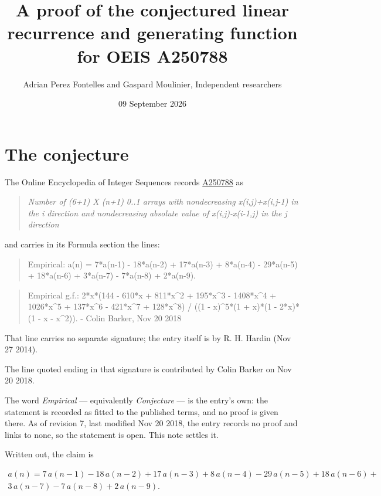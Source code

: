 \documentclass[11pt]{article}
\title{A proof of the conjectured linear recurrence and generating function for OEIS A250788}
\author{Adrian Perez Fontelles and Gaspard Moulinier, Independent researchers}
\date{09 September 2026}
\theoremstyle{definition}
\begin{document}
\maketitle
\section{The conjecture}

The Online Encyclopedia of Integer Sequences records \href{https://oeis.org/A250788}{A250788} as

\begin{quote}\itshape Number of (6+1) X (n+1) 0..1 arrays with nondecreasing x(i,j)+x(i,j-1) in the i direction and nondecreasing absolute value of x(i,j)-x(i-1,j) in the j direction\end{quote}

and carries in its Formula section the lines:

\begin{quote}\ttfamily Empirical: a(n) = 7*a(n-1) - 18*a(n-2) + 17*a(n-3) + 8*a(n-4) - 29*a(n-5) + 18*a(n-6) + 3*a(n-7) - 7*a(n-8) + 2*a(n-9).\end{quote}

\begin{quote}\ttfamily Empirical g.f.: 2*x*(144 - 610*x + 811*x\textasciicircum{}2 + 195*x\textasciicircum{}3 - 1408*x\textasciicircum{}4 + 1026*x\textasciicircum{}5 + 137*x\textasciicircum{}6 - 421*x\textasciicircum{}7 + 128*x\textasciicircum{}8) / ((1 - x)\textasciicircum{}5*(1 + x)*(1 - 2*x)*(1 - x - x\textasciicircum{}2)). - Colin Barker, Nov 20 2018\end{quote}

That line carries no separate signature; the entry itself is by R. H. Hardin (Nov 27 2014).

The line quoted ending in that signature is contributed by Colin Barker on Nov 20 2018.

The word {\itshape Empirical} --- equivalently {\itshape Conjecture} --- is the entry's own: the statement is recorded as fitted to the published terms, and no proof is given there. As of revision 7, last modified Nov 20 2018, the entry records no proof and links to none, so the statement is open. This note settles it.

Written out, the claim is

\begin{multline*} a(n) = 7\,a(n-1) - 18\,a(n-2) + 17\,a(n-3) + 8\,a(n-4) - 29\,a(n-5) + 18\,a(n-6) + \\ 3\,a(n-7) - 7\,a(n-8) + 2\,a(n-9). \end{multline*}
\end{document}
